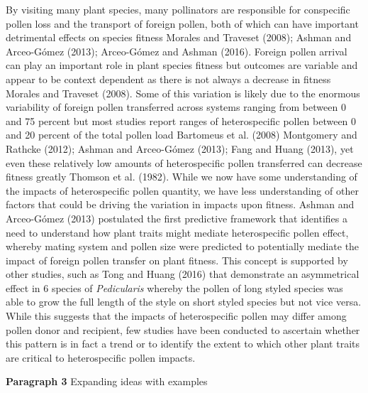 \documentclass[11pt,a4paper]{article}
\begin{document}
By visiting many plant species, many pollinators are responsible for
conspecific pollen loss and the transport of foreign pollen, both of
which can have important detrimental effects on species fitness Morales
and Traveset (2008); Ashman and Arceo-Gómez (2013); Arceo-Gómez and
Ashman (2016). Foreign pollen arrival can play an important role in
plant species fitness but outcomes are variable and appear to be context
dependent as there is not always a decrease in fitness Morales and
Traveset (2008). Some of this variation is likely due to the enormous
variability of foreign pollen transferred across systems ranging from
between 0 and 75 percent but most studies report ranges of
heterospecific pollen between 0 and 20 percent of the total pollen load
Bartomeus et al. (2008) Montgomery and Rathcke (2012); Ashman and
Arceo-Gómez (2013); Fang and Huang (2013), yet even these relatively low
amounts of heterospecific pollen transferred can decrease fitness
greatly Thomson et al. (1982). While we now have some understanding of
the impacts of heterospecific pollen quantity, we have less
understanding of other factors that could be driving the variation in
impacts upon fitness. Ashman and Arceo-Gómez (2013) postulated the first
predictive framework that identifies a need to understand how plant
traits might mediate heterospecific pollen effect, whereby mating system
and pollen size were predicted to potentially mediate the impact of
foreign pollen transfer on plant fitness. This concept is supported by
other studies, such as Tong and Huang (2016) that demonstrate an
asymmetrical effect in 6 species of \emph{Pedicularis} whereby the
pollen of long styled species was able to grow the full length of the
style on short styled species but not vice versa. While this suggests
that the impacts of heterospecific pollen may differ among pollen donor
and recipient, few studies have been conducted to ascertain whether this
pattern is in fact a trend or to identify the extent to which other
plant traits are critical to heterospecific pollen impacts.

\textbf{Paragraph 3} Expanding ideas with examples
\end{document}
